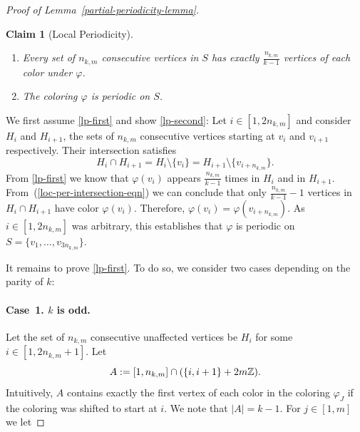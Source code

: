 \documentclass[a4paper,10pt,hidelinks]{amsart}
\renewcommand{\phi}{\ensuremath{\varphi}}
\newtheorem{claim}[theorem]{Claim}
\newenvironment{claimproof}[1][\proofname]{\proof[#1]\renewcommand{\qedsymbol}{$\blacksquare$}}{\endproof}
\theoremstyle{definition}
\begin{document}
\begin{proof}[Proof of Lemma~\ref{partial-periodicity-lemma}]
\begin{claim}[Local Periodicity]
        \begin{enumerate}[label=(\alph*)]
            \item\label{lp-first} Every set of $n_{k, m}$ consecutive vertices in $S$ has exactly $\frac{n_{k, m}}{k-1}$ vertices of each color under $\varphi$.
            \item\label{lp-second} The coloring $\varphi$ is periodic on $S$.
        \end{enumerate}
    \end{claim}

    \begin{claimproof}
        We first assume \ref{lp-first} and show \ref{lp-second}: Let $i \in [1, 2n_{k,m}]$ and consider $H_i$ and $H_{i + 1}$, the sets of $n_{k, m}$ consecutive vertices starting at $v_i$ and $v_{i + 1}$ respectively. Their intersection satisfies
        \begin{equation}\label{loc-per-intersection-eqn}
            H_i \cap H_{i+1} = H_i \setminus \{v_i\} = H_{i + 1} \setminus \{v_{i + n_{k,m}}\}.
        \end{equation}
        From \ref{lp-first} we know that $\varphi(v_i)$ appears $\frac{n_{k,m}}{k - 1}$ times in $H_i$ and in $H_{i+1}$. From~(\ref{loc-per-intersection-eqn}) we can conclude that only $\frac{n_{k,m}}{k-1} - 1$ vertices in $H_i \cap H_{i+1}$ have color $\varphi(v_i)$. Therefore, $\varphi(v_i) = \varphi(v_{i + n_{k, m}})$. As $i\in [1,2n_{k,m}]$ was arbitrary, this establishes that $\phi$ is periodic on $S=\{v_1,\ldots,v_{3n_{k,m}}\}$.

        It remains to prove \ref{lp-first}. To do so, we consider two cases depending on the parity of $k$:

        \medskip
    
        \paragraph*{\textbf{Case~1.} $k$ is odd.}
     
        Let the set of $n_{k, m}$ consecutive unaffected vertices be $H_i$ for some $i \in [1, 2n_{k,m} + 1]$. Let 
        \begin{equation}\notag
            A := [1, n_{k,m}] \cap (\{i, i + 1\} + 2m\mathbb{Z}).
        \end{equation}
        Intuitively, $A$ contains exactly the first vertex of each color in the coloring $\varphi_J$ if the coloring was shifted to start at $i$. We note that $|A| = k - 1$. For $j \in [1, m]$ we let 
        

\end{claimproof}
\end{proof}
\end{document}
